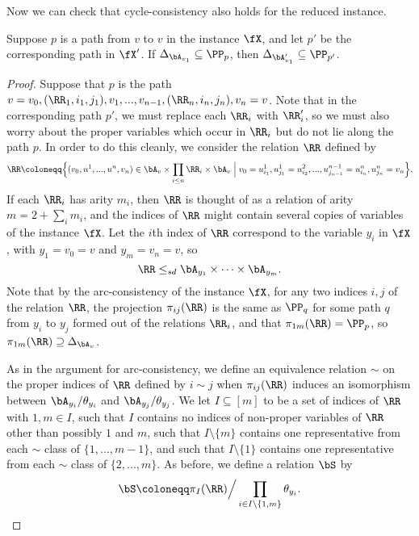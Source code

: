 Now we can check that cycle-consistency also holds for the reduced instance.

\begin{lem}\label{ancestral-red-cycle} Suppose $p$ is a path from $v$ to $v$ in the instance $\fX$, and let $p'$ be the corresponding path in $\fX'$. If $\Delta_{\bA_{v_1}} \subseteq \PP_p$, then $\Delta_{\bA_{v_1}'} \subseteq \PP_{p'}$.
\end{lem}
\begin{proof} Suppose that $p$ is the path $v = v_0, (\RR_1,i_1,j_1), v_1, ..., v_{n-1}, (\RR_n,i_n,j_n), v_n = v$. Note that in the corresponding path $p'$, we must replace each $\RR_i$ with $\RR_i'$, so we must also worry about the proper variables which occur in $\RR_i$ but do not lie along the path $p$. In order to do this cleanly, we consider the relation $\RR$ defined by
\[
\RR \coloneqq \Big\{(v_0, u^1, ..., u^n, v_n) \in \bA_v \times \prod_{i \le n} \RR_i \times \bA_v \; \Big| \;
v_0 = u^1_{i_1}, u^1_{j_1} = u^2_{i_2}, ..., u^{n-1}_{j_{n-1}} = u^n_{i_n}, u^n_{j_n} = v_n\Big\}.
\]
If each $\RR_i$ has arity $m_i$, then $\RR$ is thought of as a relation of arity $m = 2 + \sum_i m_i$, and the indices of $\RR$ might contain several copies of variables of the instance $\fX$. Let the $i$th index of $\RR$ correspond to the variable $y_i$ in $\fX$, with $y_1 = v_0 = v$ and $y_m = v_n = v$, so
\[
\RR \le_{sd} \bA_{y_1} \times \cdots \times \bA_{y_m}.
\]
Note that by the arc-consistency of the instance $\fX$, for any two indices $i,j$ of the relation $\RR$, the projection $\pi_{ij}(\RR)$ is the same as $\PP_q$ for some path $q$ from $y_i$ to $y_j$ formed out of the relations $\RR_i$, and that $\pi_{1m}(\RR) = \PP_p$, so $\pi_{1m}(\RR) \supseteq \Delta_{\bA_v}$.

As in the argument for arc-consistency, we define an equivalence relation $\sim$ on the proper indices of $\RR$ defined by $i \sim j$ when $\pi_{ij}(\RR)$ induces an isomorphism between $\bA_{y_i}/\theta_{y_i}$ and $\bA_{y_j}/\theta_{y_j}$. We let $I \subseteq [m]$ to be a set of indices of $\RR$ with $1, m \in I$, such that $I$ contains no indices of non-proper variables of $\RR$ other than possibly $1$ and $m$, such that $I \setminus \{m\}$ contains one representative from each $\sim$ class of $\{1, ..., m-1\}$, and such that $I \setminus \{1\}$ contains one representative from each $\sim$ class of $\{2, ..., m\}$. As before, we define a relation $\bS$ by
\[
\bS \coloneqq \pi_I(\RR)\Big/\prod_{i \in I \setminus\{1,m\}} \theta_{y_i}.
\]


\end{proof}
